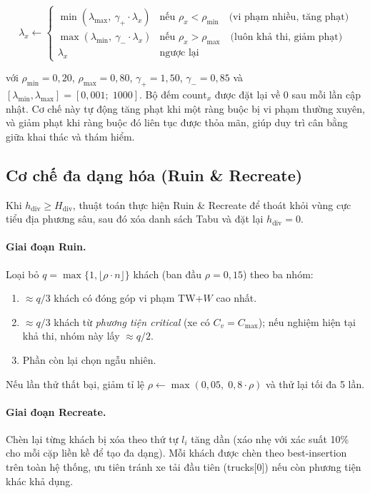 \documentclass[../DoAn.tex]{subfiles}
\begin{document}
\[
\lambda_x \leftarrow \begin{cases}
\min\!\left(\lambda_{\max},\ \gamma_+\cdot\lambda_x\right) & \text{nếu } \rho_x < \rho_{\min} \quad\text{(vi phạm nhiều, tăng phạt)} \\
\max\!\left(\lambda_{\min},\ \gamma_-\cdot\lambda_x\right) & \text{nếu } \rho_x > \rho_{\max} \quad\text{(luôn khả thi, giảm phạt)} \\
\lambda_x & \text{ngược lại}
\end{cases}
\]

với $\rho_{\min} = 0{,}20$, $\rho_{\max} = 0{,}80$, $\gamma_+ = 1{,}50$, $\gamma_- = 0{,}85$ và $[\lambda_{\min}, \lambda_{\max}] = [0{,}001;\; 1000]$. Bộ đếm $\text{count}_x$ được đặt lại về 0 sau mỗi lần cập nhật. Cơ chế này tự động tăng phạt khi một ràng buộc bị vi phạm thường xuyên, và giảm phạt khi ràng buộc đó liên tục được thỏa mãn, giúp duy trì cân bằng giữa khai thác và thám hiểm.

\subsection{Cơ chế đa dạng hóa (Ruin \& Recreate)}

Khi $h_{\text{div}} \geq H_{\text{div}}$, thuật toán thực hiện Ruin \& Recreate để thoát khỏi vùng cực tiểu địa phương sâu, sau đó xóa danh sách Tabu và đặt lại $h_{\text{div}} = 0$.

\paragraph{Giai đoạn Ruin.} Loại bỏ $q = \max\!\{1, \lfloor\rho\cdot n\rfloor\}$ khách (ban đầu $\rho = 0{,}15$) theo ba nhóm:
\begin{enumerate}
    \item $\approx q/3$ khách có đóng góp vi phạm TW+$W$ cao nhất.
    \item $\approx q/3$ khách từ \textit{phương tiện critical} (xe có $C_v = C_{\max}$); nếu nghiệm hiện tại khả thi, nhóm này lấy $\approx q/2$.
    \item Phần còn lại chọn ngẫu nhiên.
\end{enumerate}
Nếu lần thử thất bại, giảm tỉ lệ $\rho \leftarrow \max(0{,}05,\; 0{,}8\cdot\rho)$ và thử lại tối đa 5 lần.

\paragraph{Giai đoạn Recreate.} Chèn lại từng khách bị xóa theo thứ tự $l_i$ tăng dần (xáo nhẹ với xác suất 10\% cho mỗi cặp liền kề để tạo đa dạng). Mỗi khách được chèn theo best-insertion trên toàn hệ thống, ưu tiên tránh xe tải đầu tiên (trucks[0]) nếu còn phương tiện khác khả dụng.
\end{document}
